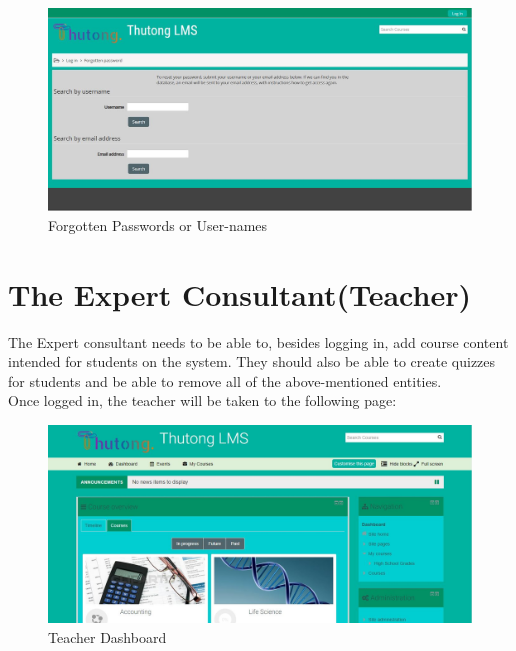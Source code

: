 \documentclass[12pt,a4paper]{article}
\begin{document}
				\begin{figure}[!]
					\centering
					\includegraphics[width=1\textwidth]{images/forgotPassword.JPG}
					\caption{Forgotten Passwords or User-names}
					\label{Figure 5}
				\end{figure}
				 
		
			
	\section{The Expert Consultant(Teacher)}
		The Expert consultant needs to be able to, besides logging in, add course content intended for students on the system. They should also be able to create quizzes for students and be able to remove all of the above-mentioned entities.\\Once logged in, the teacher will be taken to the following page:
		
		\begin{figure}[h]
			\centering
			\includegraphics[width=1\textwidth]{images/teacherDash.JPG}
			\caption{Teacher Dashboard}
			\label{Figure 6}
		\end{figure}
\end{document}
